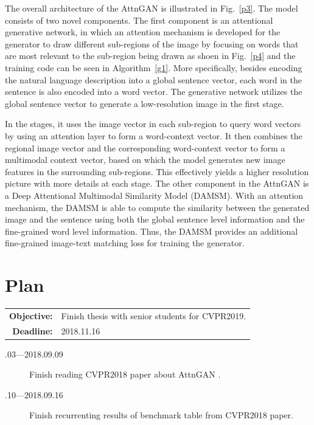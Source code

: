 \documentclass[a4paper]{article}
\begin{document}
	The overall architecture of the AttnGAN is illustrated in Fig.~\ref{p3}.  The model consists of two novel	components. The first component is an attentional generative network, in which an attention mechanism is developed for the generator to draw different sub-regions of the image by focusing on words that are most relevant to the	sub-region being drawn as shoen in Fig.~\ref{p4} and the training code can be seen in Algorithm~\ref{g1}. More specifically, besides encoding the natural  language  description into a global sentence vector, each word in the  sentence is also encoded into a word vector. The generative  network  utilizes the global sentence vector to generate a low-resolution image  in  the first stage. 
	
	In the stages, it uses the image vector in each sub-region to query word vectors by using an attention layer to form a word-context vector. It then combines the regional image vector and the corresponding word-context vector to form a multimodal context vector, based on which the model generates new image features in the surrounding sub-regions. This effectively yields a higher resolution picture with more details at each stage. The other component in the AttnGAN is a Deep Attentional Multimodal Similarity Model (DAMSM). With an attention	mechanism, the DAMSM is able to compute the similarity	between the generated image and the sentence using both	the global sentence level information and the fine-grained word level information. Thus, the DAMSM provides an additional fine-grained image-text matching loss for training the generator. 
	
	
	 
		
	\section{Plan}
	
	\begin{tabular}{rl}
		\textbf{Objective:} & Finish thesis with senior students for CVPR2019.\\
		\textbf{Deadline:} & 2018.11.16
	\end{tabular}
	
	\begin{description}
		\item[.03---2018.09.09] Finish reading CVPR2018 paper about AttnGAN \cite{Tao18attngan}.
		\item[.10---2018.09.16] Finish recurrenting results of benchmark table from CVPR2018 paper.
	\end{description}
	
	
	
	
\end{document}
